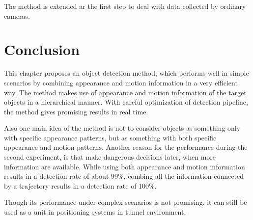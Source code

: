 The method is extended ar the first step to deal with data collected by ordinary cameras.

\section{Conclusion}
\label{conc}
 This chapter proposes an object detection method, which performs well in simple scenarios by combining appearance and motion information in a very efficient way. The method makes use of appearance and motion information of the target objects in a hierarchical manner. With careful optimization of detection pipeline, the method gives promising results in real time.

  Also one main idea of the method is not to consider objects as something only with specific appearance patterns, but as something with both
 specific appearance and motion patterns. Another reason for the performance during the second experiment, is that make dangerous decisions later, when more information are available. While using both appearance and motion information results in a detection rate of about 99\%, combing all the information connected by a trajectory results in a detection rate of 100\%.

 Though its performance under complex scenarios is not promising, it can still be used as a unit in  positioning systems in tunnel environment.
